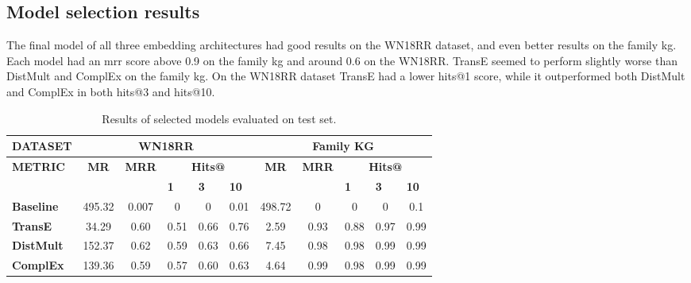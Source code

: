 \subsection{Model selection results}
The final model of all three embedding architectures had good results on the WN18RR dataset, and even better results on the family \gls{kg}. Each model had an \gls{mrr} score above 0.9 on the family \gls{kg} and around 0.6 on the WN18RR. TransE seemed to perform slightly worse than DistMult and ComplEx on the family \gls{kg}. On the WN18RR dataset TransE had a lower hits@1 score, while it outperformed both DistMult and ComplEx in both hits@3 and hits@10.
\begin{table}[htbp]
\centering
\begin{tabular}{|l||ccccc||ccccc|}
\hline
{\textbf{DATASET}}                 & \multicolumn{5}{c||}{\textbf{WN18RR}}                                                                                                                                               & \multicolumn{5}{c|}{\textbf{Family KG}}                                                                                                                            \\ \hline
\multirow{2}{*}{{\textbf{METRIC}}} & \multicolumn{1}{c|}{\multirow{2}{*}{\textbf{MR}}} & \multicolumn{1}{c|}{\multirow{2}{*}{\textbf{MRR}}} & \multicolumn{3}{c||}{\textbf{Hits@}}                                       & \multicolumn{1}{c|}{\multirow{2}{*}{\textbf{MR}}} & \multicolumn{1}{c|}{\multirow{2}{*}{\textbf{MRR}}} & \multicolumn{3}{c|}{\textbf{Hits@}}                                       \\ \cline{4-6} \cline{9-11} 
                                       & \multicolumn{1}{c|}{}                             & \multicolumn{1}{c|}{}                              & \multicolumn{1}{l|}{\textbf{1}} & \multicolumn{1}{l|}{\textbf{3}} & \multicolumn{1}{l||}{\textbf{10}} & \multicolumn{1}{c|}{}                             & \multicolumn{1}{c|}{}                              & \multicolumn{1}{l|}{\textbf{1}} & \multicolumn{1}{l|}{\textbf{3}} & \multicolumn{1}{l|}{\textbf{10}} \\ \hline
\textbf{Baseline}       & 495.32     & 0.007      & 0     & 0       & 0.01        & 498.72       & 0     & 0       & 0       & 0.1      \\ 
\textbf{TransE}  & 34.29  & 0.60       & 0.51                     & 0.66    & 0.76 & 2.59     & 0.93  &0.88  & 0.97   & 0.99   \\ 
\textbf{DistMult}      & 152.37  & 0.62    & 0.59   & 0.63      & 0.66   & 7.45    & 0.98     & 0.98    & 0.99   & 0.99    \\ 
\textbf{ComplEx}        & 139.36    & 0.59      & 0.57      & 0.60      & 0.63      & 4.64     & 0.99     & 0.98     & 0.99      & 0.99  \\ \hline
\end{tabular}
\caption[Test results of selected model.]{Results of selected models evaluated on test set.}
\end{table}


